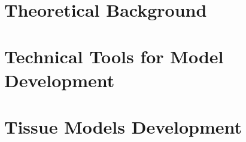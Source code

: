 \documentclass[12pt,a4paper]{report}
\begin{document}
    
    \newpage \ \newpage

    
    \clearpage

    \renewcommand{\contentsname}{Table of Contents}
    \renewcommand\cftchapafterpnum{\par\addvspace{6pt}}
    \renewcommand\cftsecafterpnum{\par\addvspace{4pt}}
    \tableofcontents{}
    \newpage \ \newpage

    
    \newpage \ \newpage

    \chapter{Theoretical Background}
        
        
        \clearpage
        
        \clearpage
        
        \clearpage

    \chapter{Technical Tools for Model Development} \label{sec:tech_tool}
        
        
        \clearpage

    \chapter{Tissue Models Development} \label{sec:models}
        
        
        \clearpage
        
        \clearpage

    
    \clearpage

    
\end{document}
